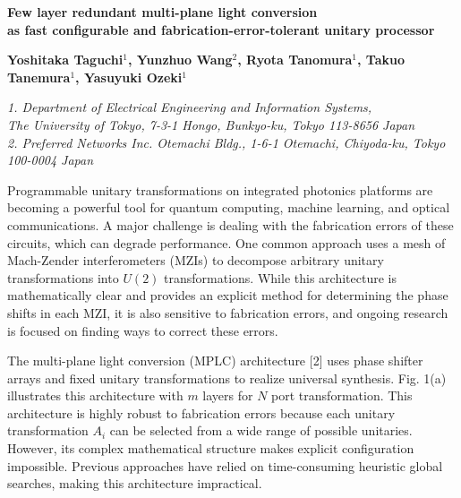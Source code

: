 \documentclass{article}
\begin{document}
\begin{center}
{\Large\bfseries
Few layer redundant multi-plane light conversion\\as fast configurable and fabrication-error-tolerant unitary processor
\par}
\vspace{1.2ex}
{\bfseries
Yoshitaka Taguchi$^{1}$, Yunzhuo Wang$^{2}$, Ryota Tanomura$^{1}$, Takuo Tanemura$^{1}$, Yasuyuki Ozeki$^{1}$\par}
{\footnotesize\itshape
1. Department of Electrical Engineering and Information Systems,\\The University of Tokyo, 7-3-1 Hongo, Bunkyo-ku, Tokyo 113-8656 Japan\\
2. Preferred Networks Inc. Otemachi Bldg., 1-6-1 Otemachi, Chiyoda-ku, Tokyo 100-0004 Japan\par}
\vspace{1.2ex}
\end{center}
Programmable unitary transformations on integrated photonics platforms are becoming a powerful tool for quantum computing, machine learning, and optical communications. A major challenge is dealing with the fabrication errors of these circuits, which can degrade performance. One common approach uses a mesh of Mach-Zender interferometers (MZIs) to decompose arbitrary unitary transformations into $U(2)$ transformations. While this architecture is mathematically clear and provides an explicit method for determining the phase shifts in each MZI, it is also sensitive to fabrication errors, and ongoing research is focused on finding ways to correct these errors.

The multi-plane light conversion (MPLC) architecture [2] uses phase shifter arrays and fixed unitary transformations to realize universal synthesis. Fig. 1(a) illustrates this architecture with $m$ layers for $N$ port transformation. This architecture is highly robust to fabrication errors because each unitary transformation $A_i$ can be selected from a wide range of possible unitaries. However, its complex mathematical structure makes explicit configuration impossible. Previous approaches have relied on time-consuming heuristic global searches, making this architecture impractical.
\end{document}
